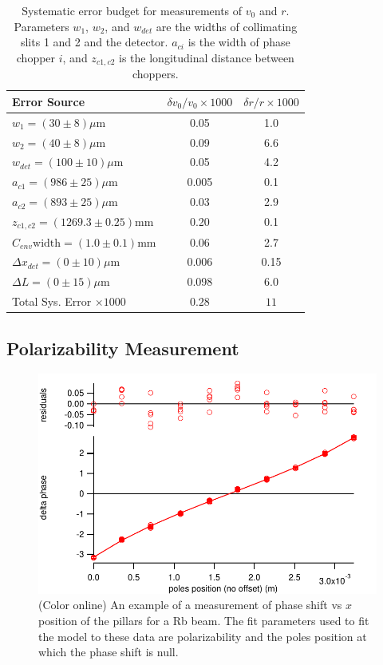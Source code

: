 \documentclass[twocolumn,prl,showpacs,superscriptaddress]{revtex4-1}   %
\newcommand{\sigv}{0.28}
\newcommand{\sigr}{11}
\begin{document}
\begingroup
\begin{table}
\caption{\label{tableVelError}Systematic error budget for measurements of $v_0$ and $r$. Parameters $w_1$, $w_2$, and $w_{det}$ are the widths of collimating slits 1 and 2 and the detector. $a_{ci}$ is the width of phase chopper $i$, and $z_{c1,c2}$ is the longitudinal distance between choppers.}
\begin{center}
\begin{tabular}{l c c}
\hline\hline
Error Source & $\delta v_0/v_0 \times 1000$ & $\delta r/r \times 1000$ \\
\hline
$w_1 = (30 \pm 8) \mu\mathrm{m}$ 		& 0.05 & 1.0 \\
$w_2 = (40 \pm 8) \mu\mathrm{m}$ 		& 0.09 & 6.6 \\
$w_{det} = (100 \pm 10) \mu\mathrm{m}$ 		& 0.05 & 4.2 \\
$a_{c1} = (986 \pm 25) \mu\mathrm{m}$ 		& 0.005 & 0.1 \\
$a_{c2} = (893 \pm 25) \mu\mathrm{m}$ 		& 0.03 & 2.9 \\
$z_{c1,c2} = (1269.3 \pm 0.25) \mathrm{mm}$ 		& 0.20 & 0.1 \\
$C_{env} \mathrm{width} = (1.0 \pm 0.1) \mathrm{mm}$ 		& 0.06 & 2.7 \\
$\Delta x_{det} = (0 \pm 10) \mu\mathrm{m}$ 		& 0.006 & 0.15 \\
$\Delta L = (0 \pm 15) \mu\mathrm{m}$		& 0.098 & 6.0 \\
\hline
Total Sys. Error $\times 1000$ & $\sigv$ & $\sigr$ \\
\hline\hline
\end{tabular}
\end{center}
\end{table}
\endgroup

\subsection{Polarizability Measurement}

\begin{figure}
\includegraphics[width=\linewidth,keepaspectratio]{dPvMP_150327_q.pdf}
\caption{\label{dPvMPExample}(Color online) An example of a measurement of phase shift vs $x$ position of the pillars for a Rb beam. The fit parameters used to fit the model to these data are polarizability and the poles position at which the phase shift is null.}
\end{figure}
\end{document}
